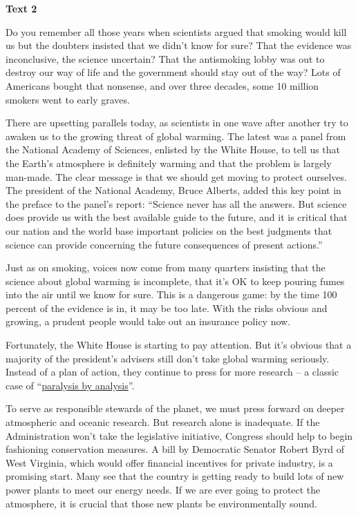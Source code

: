 
\begin{center}\textbf{Text 2}\end{center}

\qquad Do you remember all those years when scientists argued that smoking would kill us but the doubters insisted that we didn't know for sure? That the evidence was inconclusive, the science uncertain? That the antismoking lobby was out to destroy our way of life and the government should stay out of the way? Lots of Americans bought that nonsense, and over three decades, some 10 million smokers went to early graves.

\qquad There are upsetting parallels today, as scientists in one wave after another try to awaken us to the growing threat of global warming. The latest was a panel from the National Academy of Sciences, enlisted by the White House, to tell us that the Earth's atmosphere is definitely warming and that the problem is largely man-made. The clear message is that we should get moving to protect ourselves. The president of the National Academy, Bruce Alberts, added this key point in the preface to the panel's report: ``Science never has all the answers. But science does provide us with the best available guide to the future, and it is critical that our nation and the world base important policies on the best judgments that science can provide concerning the future consequences of present actions.''

\qquad Just as on smoking, voices now come from many quarters insisting that the science about global warming is incomplete, that it's OK to keep pouring fumes into the air until we know for sure. This is a dangerous game: by the time 100 percent of the evidence is in, it may be too late. With the risks obvious and growing, a prudent people would take out an insurance policy now.

\qquad Fortunately, the White House is starting to pay attention. But it's obvious that a majority of the president's advisers still don't take global warming seriously. Instead of a plan of action, they continue to press for more research -- a classic case of ``\ul{paralysis by analysis}''.

\qquad To serve as responsible stewards of the planet, we must press forward on deeper atmospheric and oceanic research. But research alone is inadequate. If the Administration won't take the legislative initiative, Congress should help to begin fashioning conservation measures. A bill by Democratic Senator Robert Byrd of West Virginia, which would offer financial incentives for private industry, is a promising start. Many see that the country is getting ready to build lots of new power plants to meet our energy needs. If we are ever going to protect the atmosphere, it is crucial that those new plants be environmentally sound.

